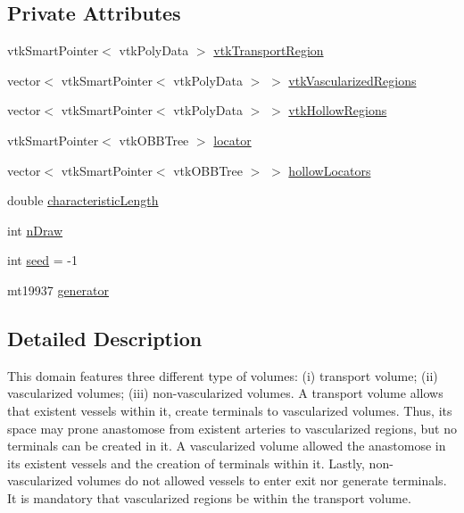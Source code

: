 \subsection*{Private Attributes}
\begin{DoxyCompactItemize}
\item 
vtk\+Smart\+Pointer$<$ vtk\+Poly\+Data $>$ \hyperlink{class_partially_vascularized_domain_af4d0cd0bc35113adccb312f4b07dcd72}{vtk\+Transport\+Region}
\item 
vector$<$ vtk\+Smart\+Pointer$<$ vtk\+Poly\+Data $>$ $>$ \hyperlink{class_partially_vascularized_domain_aeacff4635f73c185d8a83a3a824b49cb}{vtk\+Vascularized\+Regions}
\item 
vector$<$ vtk\+Smart\+Pointer$<$ vtk\+Poly\+Data $>$ $>$ \hyperlink{class_partially_vascularized_domain_a725b3a41a8c28011def02f193121b99b}{vtk\+Hollow\+Regions}
\item 
vtk\+Smart\+Pointer$<$ vtk\+O\+B\+B\+Tree $>$ \hyperlink{class_partially_vascularized_domain_a3e4d13820b8ed9beea9bf9d3bfc807a2}{locator}
\item 
vector$<$ vtk\+Smart\+Pointer$<$ vtk\+O\+B\+B\+Tree $>$ $>$ \hyperlink{class_partially_vascularized_domain_abce195c2c0bd9f52cf932560539aec57}{hollow\+Locators}
\item 
double \hyperlink{class_partially_vascularized_domain_ac79741173831cc9628ccf7ad193f2812}{characteristic\+Length}
\item 
int \hyperlink{class_partially_vascularized_domain_ae88320ec5cef5465ad2c74ce201d5131}{n\+Draw}
\item 
int \hyperlink{class_partially_vascularized_domain_a443b5b60ce756ea5bfb05c628ed4af0d}{seed} = -\/1
\item 
mt19937 \hyperlink{class_partially_vascularized_domain_a78f13fd2210c58eae813d057b580c3cc}{generator}
\end{DoxyCompactItemize}


\subsection{Detailed Description}
This domain features three different type of volumes\+: (i) transport volume; (ii) vascularized volumes; (iii) non-\/vascularized volumes. A transport volume allows that existent vessels within it, create terminals to vascularized volumes. Thus, its space may prone anastomose from existent arteries to vascularized regions, but no terminals can be created in it. A vascularized volume allowed the anastomose in its existent vessels and the creation of terminals within it. Lastly, non-\/vascularized volumes do not allowed vessels to enter exit nor generate terminals. It is mandatory that vascularized regions be within the transport volume. 

